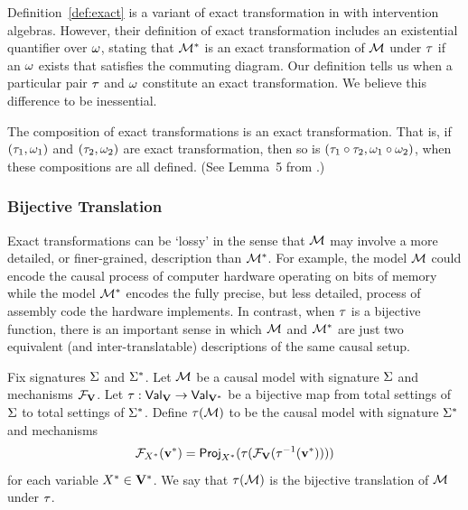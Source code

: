 \documentclass[twoside,11pt]{article}
\begin{document}
 \begin{remark} Definition~\ref{def:exact} is a variant of exact transformation in \cite{Rubinstein2017} with intervention algebras. However, their definition of exact transformation includes an existential quantifier over $\intmap$, stating that $\model^*$ is an exact transformation of $\model$ under $\setmap$ if an $\intmap$ exists that satisfies the commuting diagram. Our definition tells us when a particular pair $\setmap$ and $\intmap$ constitute an exact transformation. We believe this difference to be inessential.
 \end{remark}


\begin{remark}
 The composition of exact transformations is an exact transformation. That is, if $(\setmap_1,\intmap_1)$ and $(\setmap_2,\intmap_2)$ are exact transformation, then so is $(\setmap_1\circ \setmap_2,\intmap_1\circ \intmap_2)$, when these compositions are all defined. (See Lemma~5 from \citealt{Rubinstein2017}.)
\end{remark}



\subsubsection{Bijective Translation}\label{sec:bijtrans}
Exact transformations can be `lossy' in the sense that $\model$ may involve a more detailed, or finer-grained, description than $\model^*$. For example, the model $\model$ could encode the causal process of computer hardware operating on bits of memory while the model $\model^*$ encodes the fully precise, but less detailed, process of assembly code the hardware implements. In contrast, when $\setmap$ is a bijective function, there is an important sense in which $\model$ and $\model^*$ are just two equivalent (and inter-translatable) descriptions of the same causal setup. 

\begin{definition}\label{def:bijtrans}
Fix signatures $\signature$ and $\signature^*$. Let $\model$ be a causal model with signature $\signature$ and mechanisms $\mechanism{\allvars}$. Let $\setmap: \values{\allvars} \to \values{\allvars^*}$ be a bijective map from total settings of $\signature$ to total settings of $\signature^*$. Define $\setmap(\model)$ to be the causal model with signature $\signature^*$ and mechanisms \[\mechanism{\onevar^*}(\tset^*) = \project{\setmap(\mechanism{\allvars}(\setmap^{-1}(\mathbf{\tset^*})))}{\onevar^*}\] for each variable $\onevar^* \in \allvars^*$.
We say that $\setmap(\model)$ is the bijective translation of $\model$ under $\setmap$. \label{def:translation}
\end{definition}
\end{document}
